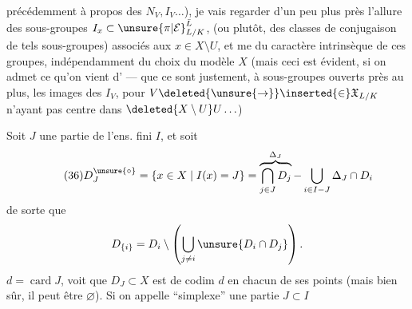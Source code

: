 
précédemment à propos des $N_V,I_V\ldots$), je vais regarder d'un peu plus près l'allure des sous-groupes $I_x\subset\unsure{\pi|\mathcal E}_{L/K}^{\bar L}$, (ou  plutôt, des classes de \inserted{$\pi$-}conjugaison de tels sous-groupes) associés aux $x\in X\setminus U$,  et me  du caractère intrinsèque de ces groupes, indépendamment du choix du modèle $X$ (mais ceci est évident, si on admet ce qu'on vient d' --- que ce sont justement, à sous-groupes ouverts près  au plus, les images des $I_V$, pour $V\deleted{\unsure{\to}}\inserted{\in}\mathfrak X_{L/K}$ n'ayant pas  centre dans $\deleted{X\setminus U}U\ldots$)


Soit $J$ une partie de l'ens. fini $I$, et soit
\[
\tag{36}
D_J^{\unsure{\circ}}=\{x\in X\mid I(x)=J\}
=\overbrace{\bigcap_{j\in J}D_j}^{\Delta_J}-\bigcup_{i\in I-J}\Delta_J\cap D_i
\]
de sorte que
\[
D_{\{i\}}=D_i\setminus\left(\bigcup_{j\ne i}\unsure{D_i\cap D_j}\right).
\]
 $d=\operatorname{card}J$,  voit que $D_J\subset X$ est  de codim $d$ en chacun de ses points (mais bien sûr, il peut être $\varnothing$). Si on appelle ``simplexe'' une partie $J\subset I$


